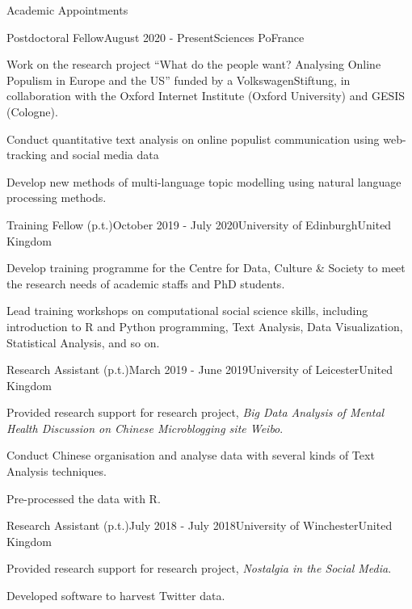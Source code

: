 \documentclass{resume} %
\begin{document}
\begin{rSection}{Academic Appointments}

\begin{rSubsection}{Postdoctoral Fellow}{August 2020 - Present}{Sciences Po}{France}
\item Work on the research project ``What do the people want? Analysing Online Populism in Europe and the US'' funded by a VolkswagenStiftung, in collaboration with the Oxford Internet Institute (Oxford University) and GESIS (Cologne).
\item Conduct quantitative text analysis on online populist communication using web-tracking and social media data
\item Develop new methods of multi-language topic modelling using natural language processing methods.
\end{rSubsection}

\newpage
\begin{rSubsection}{Training Fellow (p.t.)}{October 2019 - July 2020}{University of Edinburgh}{United Kingdom}
\item Develop training programme for the Centre for Data, Culture \& Society to meet the research needs of academic staffs and PhD students.
\item Lead training workshops on computational social science skills, including introduction to R and Python programming, Text Analysis, Data Visualization, Statistical Analysis, and so on.
\end{rSubsection}


\begin{rSubsection}{Research Assistant (p.t.)}{March 2019 - June 2019}{University of Leicester}{United Kingdom}
\item Provided research support for research project, \textit{Big Data Analysis of Mental Health Discussion on Chinese Microblogging site Weibo}.
\item Conduct Chinese organisation and analyse data with several kinds of Text Analysis techniques.
\item Pre-processed the data with R.
\end{rSubsection}


\begin{rSubsection}{Research Assistant (p.t.)}{July 2018 - July 2018}{University of Winchester}{United Kingdom}
\item Provided research support for research project, \textit{Nostalgia in the Social Media}.
\item Developed software to harvest Twitter data.
\end{rSubsection}


\end{rSection}
\end{document}
